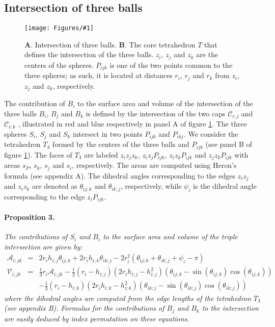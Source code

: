 \documentclass[11 pt]{article}
\theoremstyle{plain} \theorembodyfont{\rmfamily}
\newcommand{\centerfig}[2]{%
\centerline{\texttt{[image: Figures/\#1]}}
}
\begin{document}
 
\subsection*{Intersection of three balls}

\begin{figure}[hbt]
	\centerfig{ThreeSphere1}{width=5 in}
\caption{\textbf{A}. Intersection of three balls. \textbf{B}. The core tetrahedron $T$ that defines the intersection of the three balls. $z_i$, $z_j$ and
	 $z_k$ are the centers of the spheres. $P_{ijk}$ is one of the two points common to the three spheres; as such, it is located at distances $r_i$, $r_j$ and $r_k$ from $z_i$, $z_j$ and $z_k$, respectively. }
	\label{fig:2cap3d}
\end{figure}

The contribution of $B_i$ to the surface area and volume of the intersection of the three balls $B_i$, $B_j$ and $B_k$ is defined by the intersection of the two caps $\mathcal{C}_{i;j}$ and $\mathcal{C}_{i:k}$ , illustrated in red and blue respectively in panel A of figure \ref{fig:2cap3d}.  The three spheres $S_i$, $S_j$ and $S_k$ intersect in two points $P_{ijk}$ and $P_{ikj}$.  We consider the tetrahedron $T_3$ formed by the centers of the three balls and $P_{ijk}$ (see panel B of figure \ref{fig:2cap3d}).  The faces of $T_3$  are labeled $z_iz_jz_k$, $z_iz_jP_{ijk}$, $z_iz_kP_{ijk}$ and $z_jz_kP_{ijk}$ with areas $s_P$, $s_k$, $s_j$ and $s_i$, respectively. The areas are computed using Heron's formula (see appendix A). The dihedral angles corresponding to the edges $z_iz_j$ and $z_iz_k$ are denoted as $\theta_{ij;k}$ and $\theta_{ik;j}$, respectively, while $\psi_i$ is the dihedral angle corresponding to the edge $z_iP_{ijk}$.
\paragraph{Proposition 3.}
\emph{The contributions of $S_i$ and $B_i$ to the surface area and volume of the triple intersection are given by:}
\begin{eqnarray}
 \mathcal{A}_{i;jk} &=&2 r_i h_{i;j} \theta_{ij;k}  + 2 r_i h_{i;k} \theta_{ik;j} - 2 r_i^2(\theta_{ij;k} + \theta_{ik;j} + \psi_{i} - \pi) \label{eqn:threesurf} \\
 \mathcal{V}_{i;jk} &=& \frac{1}{3} r_i \mathcal{A}_{i;jk} - \frac{1}{3} (r_i - h_{i;j})  ( 2r_i h_{i;j} -h_{i;j}^2) \left (\theta_{ij;k} - \sin \left( \theta_{ij;k} \right) \cos \left( \theta_{ij;k} \right)\right)  \nonumber \\
&&- \frac{1}{3} (r_i - h_{i;k})( 2r_i h_{i;k} -h_{i;k}^2) \left (\theta_{ik;j} - \sin \left( \theta_{ik;j} \right) \cos \left( \theta_{ik;j} \right)\right) \label{eqn:threevol}
\end{eqnarray}
\emph{where the dihedral angles are computed from the edge lengths of the tetrahedron $T_3$ (see appendix B).
Formulas for the contributions of $B_j$ and $B_k$ to the intersection are easily deduced by index permutation on these equations.}
\end{document}
